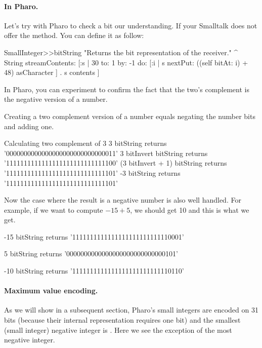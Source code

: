 \documentclass[a4paper,10pt,twoside]{book}
\begin{document}
\paragraph{In Pharo.}
Let's try with Pharo to check a bit our understanding. 
If your Smalltalk does not offer the  method. You can define it as follow:
\begin{code}{}
SmallInteger>>bitString
	"Returns the bit representation of the receiver."
	^ String streamContents: [:s | 
		30 to: 1 by: -1 do: [:i | s nextPut: ((self bitAt: i) + 48) asCharacter ] .
		s contents ]
\end{code}
	
In Pharo, you can experiment to confirm the fact that the two's complement is the negative version of a number.
 
	
	
Creating a two complement version of a number equals negating the number bits and adding one.
\begin{code}{Calculating two complement of 3}
3 bitString 
	returns '0000000000000000000000000000011'
3 bitInvert bitString 
	returns '1111111111111111111111111111100'
(3 bitInvert + 1) bitString 
	returns '1111111111111111111111111111101'
-3 bitString 
	returns '1111111111111111111111111111101'
\end{code}


Now the case where the result is a negative number is also well handled. For example, if we want to compute $-15 + 5$, we should get 10 and this is what we get.

\begin{code}{}
-15 bitString 
	returns '1111111111111111111111111110001'

5 bitString 
	returns '0000000000000000000000000000101'
	
-10 bitString 
	returns '1111111111111111111111111110110'
\end{code}


\paragraph{Maximum value encoding.}		
As we will show in a subsequent section, Pharo's small integers are encoded on 31 bits (because their internal representation requires one bit) and the smallest (small integer) negative integer is . Here we see the exception of the most negative integer.
\end{document}
